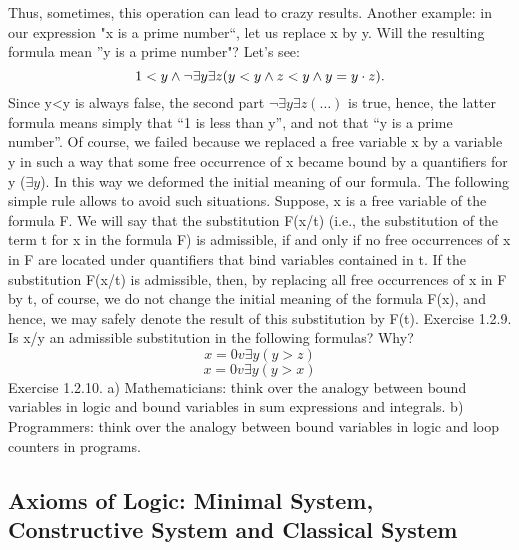 Thus, sometimes, this operation can lead to crazy results. Another example: in our expression "x is a
prime number``, let us replace x by y. Will the resulting formula mean ''y is a prime number"? Let's see:
\[1<y \wedge  \neg \exists y\exists z(y<y \wedge  z<y \wedge  y=y\cdot z).\]
Since y<y is always false, the second part \(\neg \exists y\exists z(\ldots )\) is true, hence, the latter formula means simply that
``1 is less than y'', and not that ``y is a prime number''.
Of course, we failed because we replaced a free variable x by a variable y in such a way that some free
occurrence of x became bound by a quantifiers for y (\(\exists y\)). In this way we deformed the initial meaning
of our formula.
The following simple rule allows to avoid such situations. Suppose, x is a free variable of the formula F.
We will say that the substitution F(x/t) (i.e., the substitution of the term t for x in the formula F) is
admissible, if and only if no free occurrences of x in F are located under quantifiers that bind variables
contained in t. If the substitution F(x/t) is admissible, then, by replacing all free occurrences of x in F by t,
of course, we do not change the initial meaning of the formula F(x), and hence, we may safely denote the
result of this substitution by F(t).
Exercise 1.2.9. Is x/y an admissible substitution in the following formulas? Why?
\[x=0 v \exists y(y>z)\]
\[x=0 v \exists y(y>x)\]
Exercise 1.2.10. a) Mathematicians: think over the analogy between bound variables in logic and bound
variables in sum expressions and integrals.
b) Programmers: think over the analogy between bound variables in logic and loop counters in programs.

\subsection{Axioms of Logic: Minimal System, Constructive System and Classical System}

